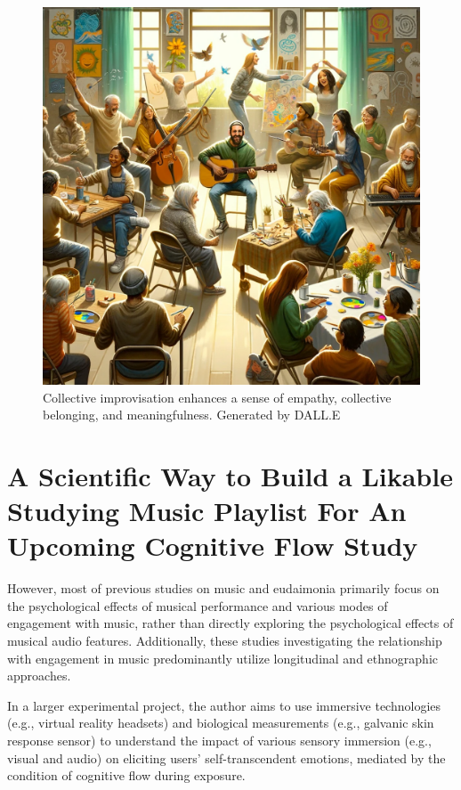 \documentclass[
]{book}
\begin{document}
\begin{figure}
\centering
\includegraphics{2.png}
\caption{Collective improvisation enhances a sense of empathy, collective belonging, and meaningfulness. Generated by DALL.E}
\end{figure}

\hypertarget{a-scientific-way-to-build-a-likable-studying-music-playlist-for-an-upcoming-cognitive-flow-study}{%
\section{A Scientific Way to Build a Likable Studying Music Playlist For An Upcoming Cognitive Flow Study}\label{a-scientific-way-to-build-a-likable-studying-music-playlist-for-an-upcoming-cognitive-flow-study}}

However, most of previous studies on music and eudaimonia primarily focus on the psychological effects of musical performance and various modes of engagement with music, rather than directly exploring the psychological effects of musical audio features. Additionally, these studies investigating the relationship with engagement in music predominantly utilize longitudinal and ethnographic approaches.

In a larger experimental project, the author aims to use immersive technologies (e.g., virtual reality headsets) and biological measurements (e.g., galvanic skin response sensor) to understand the impact of various sensory immersion (e.g., visual and audio) on eliciting users' self-transcendent emotions, mediated by the condition of cognitive flow during exposure.
\end{document}
